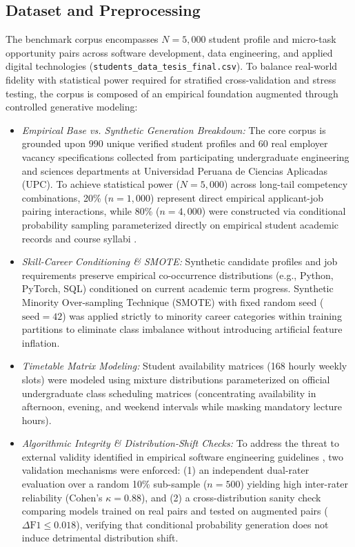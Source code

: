 \documentclass[a4paper,fleqn]{cas-dc}
\begin{document}
\subsection{Dataset and Preprocessing}
The benchmark corpus encompasses $N = 5,000$ student profile and micro-task opportunity pairs across software development, data engineering, and applied digital technologies (\texttt{students\_data\_tesis\_final.csv}). To balance real-world fidelity with statistical power required for stratified cross-validation and stress testing, the corpus is composed of an empirical foundation augmented through controlled generative modeling:
\begin{itemize}
    \item \textit{Empirical Base vs. Synthetic Generation Breakdown:} The core corpus is grounded upon $990$ unique verified student profiles and $60$ real employer vacancy specifications collected from participating undergraduate engineering and sciences departments at Universidad Peruana de Ciencias Aplicadas (UPC). To achieve statistical power ($N = 5,000$) across long-tail competency combinations, 20\% ($n = 1,000$) represent direct empirical applicant-job pairing interactions, while 80\% ($n = 4,000$) were constructed via conditional probability sampling parameterized directly on empirical student academic records and course syllabi \cite{rebaza2025, huaman2024}.
    \item \textit{Skill-Career Conditioning \& SMOTE:} Synthetic candidate profiles and job requirements preserve empirical co-occurrence distributions (e.g., Python, PyTorch, SQL) conditioned on current academic term progress. Synthetic Minority Over-sampling Technique (SMOTE) with fixed random seed ($\text{seed} = 42$) was applied strictly to minority career categories within training partitions to eliminate class imbalance without introducing artificial feature inflation.
    \item \textit{Timetable Matrix Modeling:} Student availability matrices (168 hourly weekly slots) were modeled using mixture distributions parameterized on official undergraduate class scheduling matrices (concentrating availability in afternoon, evening, and weekend intervals while masking mandatory lecture hours).
    \item \textit{Algorithmic Integrity \& Distribution-Shift Checks:} To address the threat to external validity identified in empirical software engineering guidelines \cite{wohlin2012}, two validation mechanisms were enforced: (1) an independent dual-rater evaluation over a random 10\% sub-sample ($n = 500$) yielding high inter-rater reliability (Cohen's $\kappa = 0.88$), and (2) a cross-distribution sanity check comparing models trained on real pairs and tested on augmented pairs ($\Delta\text{F1} \le 0.018$), verifying that conditional probability generation does not induce detrimental distribution shift.

\end{itemize}
\end{document}
